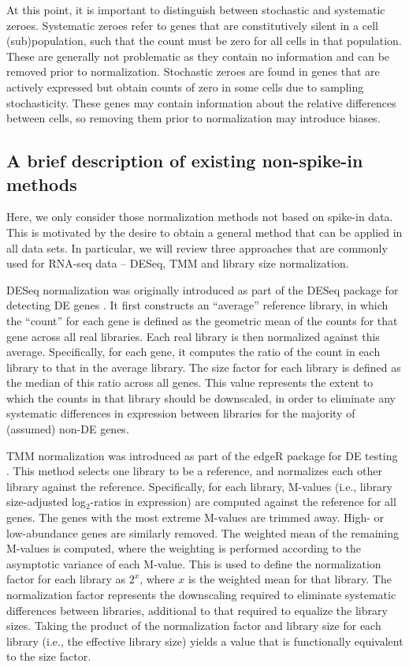 \documentclass{article}
\begin{document}
At this point, it is important to distinguish between stochastic and systematic zeroes.
Systematic zeroes refer to genes that are constitutively silent in a cell (sub)population, such that the count must be zero for all cells in that population.
These are generally not problematic as they contain no information and can be removed prior to normalization.
Stochastic zeroes are found in genes that are actively expressed but obtain counts of zero in some cells due to sampling stochasticity.
These genes may contain information about the relative differences between cells, so removing them prior to normalization may introduce biases.

\subsection{A brief description of existing non-spike-in methods}
Here, we only consider those normalization methods not based on spike-in data.
This is motivated by the desire to obtain a general method that can be applied in all data sets.
In particular, we will review three approaches that are commonly used for RNA-seq data -- DESeq, TMM and library size normalization.

DESeq normalization was originally introduced as part of the DESeq package for detecting DE genes \cite{anders2010differential}.
It first constructs an ``average'' reference library, in which the ``count'' for each gene is defined as the geometric mean of the counts for that gene across all real libraries.
Each real library is then normalized against this average.
Specifically, for each gene, it computes the ratio of the count in each library to that in the average library.
The size factor for each library is defined as the median of this ratio across all genes.
This value represents the extent to which the counts in that library should be downscaled, 
    in order to eliminate any systematic differences in expression between libraries for the majority of (assumed) non-DE genes.

TMM normalization was introduced as part of the edgeR package for DE testing \cite{robinson2010edgeR}.
This method selects one library to be a reference, and normalizes each other library against the reference.
Specifically, for each library, M-values (i.e., library size-adjusted log$_2$-ratios in expression) are computed against the reference for all genes.
The genes with the most extreme M-values are trimmed away.
High- or low-abundance genes are similarly removed.
The weighted mean of the remaining M-values is computed, where the weighting is performed according to the asymptotic variance of each M-value.
This is used to define the normalization factor for each library as $2^x$, where $x$ is the weighted mean for that library.
The normalization factor represents the downscaling required to eliminate systematic differences between libraries, additional to that required to equalize the library sizes.
Taking the product of the normalization factor and library size for each library (i.e., the effective library size) yields a value that is functionally equivalent to the size factor.
\end{document}

